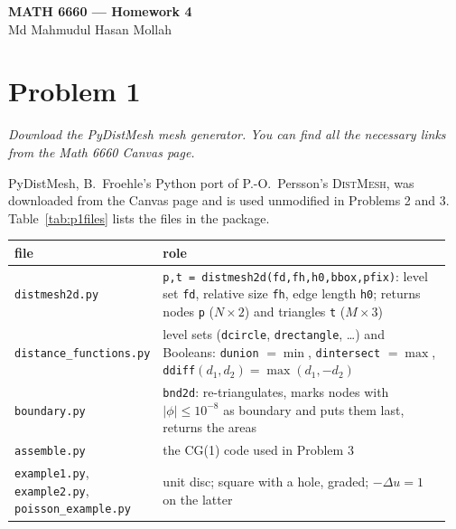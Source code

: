 \documentclass[11pt]{article}
\newcommand{\abs}[1]{\lvert #1\rvert}
\newcommand{\lap}{\Delta}
\newcommand{\problem}[2]{%
  \section*{Problem #1}%
  \renewcommand{\theequation}{#2.\arabic{equation}}%
  \setcounter{equation}{0}}
\begin{document}
\begin{center}
  {\large\bfseries MATH 6660 --- Homework 4}\\[2pt]
  {\small Md Mahmudul Hasan Mollah}
\end{center}



\problem{1}{1}

\textit{Download the PyDistMesh mesh generator.  You can find all the
necessary links from the Math 6660 Canvas page.}

PyDistMesh, B.~Froehle's Python port of P.-O.~Persson's \textsc{DistMesh},
was downloaded from the Canvas page and is used unmodified in Problems 2
and 3.  Table~\ref{tab:p1files} lists the files in the package.
 

\begin{center}
\begin{minipage}{\linewidth}
\centering\footnotesize
\begin{tabular}{@{}>{\raggedright\arraybackslash}p{0.27\linewidth}>{\raggedright\arraybackslash}p{0.69\linewidth}@{}}
\toprule
file & role\\
\midrule
\texttt{distmesh2d.py} & \texttt{p,t = distmesh2d(fd,fh,h0,bbox,pfix)}: level set
  \texttt{fd}, relative size \texttt{fh}, edge length \texttt{h0}; returns
  nodes \texttt{p} ($N\times2$) and triangles \texttt{t} ($M\times3$)\\
\texttt{distance\_functions.py} & level sets (\texttt{dcircle},
  \texttt{drectangle}, \dots) and Booleans: \texttt{dunion} $=\min$,
  \texttt{dintersect} $=\max$, \texttt{ddiff}$(d_1,d_2)=\max(d_1,-d_2)$\\
\texttt{boundary.py} & \texttt{bnd2d}: re-triangulates, marks nodes with
  $\abs{\phi}\le10^{-8}$ as boundary and puts them last, returns the areas\\
\texttt{assemble.py} & the CG(1) code used in Problem 3\\
\texttt{example1.py}, \texttt{example2.py}, \texttt{poisson\_example.py} &
  unit disc; square with a hole, graded; $-\lap u=1$ on the latter\\
\bottomrule
\end{tabular}
\label{tab:p1files}
\end{minipage}
\end{center}

 
\end{document}
